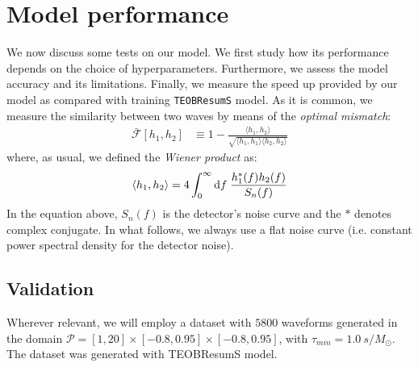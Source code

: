 \section{Model performance}
\label{sec:performance}
We now discuss some tests on our model. We first study how its performance depends on the choice of hyperparameters. Furthermore, we assess the model accuracy and its limitations.
Finally, we measure the speed up provided by our model as compared with training \texttt{TEOBResumS} model.
As it is common, we measure the similarity between two waves by means of the \textit{optimal mismatch}:
\begin{align}
	\bar{\mathcal{F}}[h_1,h_2] &\equiv 1- \frac{\langle h_1, h_2 \rangle}{\sqrt{\langle h_1, h_1 \rangle \langle h_2, h_2 \rangle}}	\label{eq:mismatch_def}
\end{align}
where, as usual, we defined the \textit{Wiener product} as:
\begin{equation}
	 {\langle h_1, h_2 \rangle} = 4 \int_0^\infty \operatorname{d}\!{f} \; \frac{h_1^*(f) h_2(f)}{S_n(f)}
	\label{ew:Wiener}
\end{equation}
In the equation above, $S_n(f)$ is the detector's noise curve and the $*$ denotes complex conjugate.
In what follows, we always use a flat noise curve (i.e. constant power spectral density for the detector noise).

\subsection{Validation}
Wherever relevant, we will employ a dataset with $5800$ waveforms generated in the domain $\mathcal{P} = [1,20]\times[-0.8,0.95]\times[-0.8,0.95]$, with $\tau_{min} = \SI{1.0}{s/M_\odot}$. The dataset was generated with TEOBResumS model.
